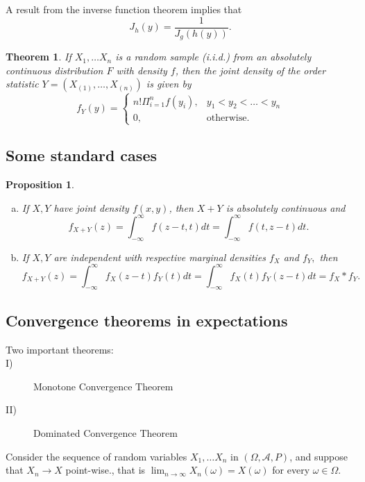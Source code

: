 \documentclass[12pt]{report} \addtolength{\textheight}{2in}
\newtheorem{prop}{Proposition}
\newtheorem{thm}{Theorem}
\newcommand{\totalint}{\int_{-\infty}^{\infty}}
\newcommand{\bigA}{\mathcal{A}}
\newcommand{\probsp}{(\Omega, \bigA, P)}
\begin{document}
A result from the inverse function theorem implies that 
\begin{displaymath}
J_h(y)=\frac{1}{J_g(h(y))}.
\end{displaymath}
\begin{thm}
If $X_1,\dots X_n$ is a random sample (i.i.d.) from an absolutely continuous distribution $F$ with density $f$, then the joint density of the order statistic $Y= (X_{(1)},\dots, X_{(n)})$ is given by
\begin{displaymath}
f_Y(y)=\begin{cases}
n!\Pi_{i=1}^{n}f(y_i), & y_1 < y_2 <\dots < y_n\\
0, & \text{otherwise.}
\end{cases}
\end{displaymath}
\end{thm}

\subsection*{Some standard cases}
\begin{prop}
\begin{enumerate}[(a)]
\item If $X,Y$ have joint density $f(x,y)$, then $X+Y$ is absolutely continuous and 
\begin{displaymath}
f_{X+Y}(z)=\totalint f(z-t,t)dt=\totalint f(t,z-t)dt.
\end{displaymath}
\item If $X,Y$ are independent with respective marginal densities $f_X$ and $f_Y,$ then
\begin{displaymath}
f_{X+Y}(z)=\totalint f_X(z-t)f_Y(t)dt=\totalint f_X(t)f_Y(z-t)dt = f_X\ast f_Y.
\end{displaymath} 
\end{enumerate}
\end{prop}
\subsection*{Convergence theorems in expectations}
\begin{description}
\item[Two important theorems:] 
\item[I)] Monotone Convergence Theorem
\item[II)] Dominated Convergence Theorem
\end{description}

Consider the sequence of random variables $X_1,\dots X_n$ in $\probsp$, and suppose that $X_n \to X$ point-wise., that is $\lim_{n\to\infty}X_n(\omega)=X(\omega)$ for every $\omega \in \Omega.$\\
\vspace{.1in}
\end{document}
